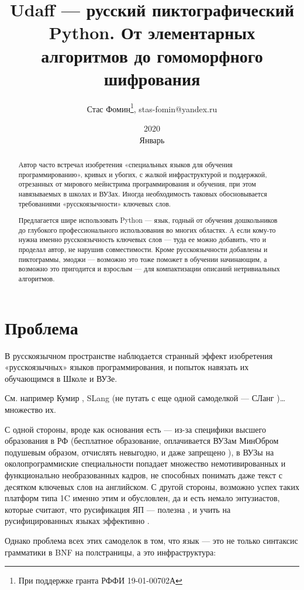 ﻿\documentclass[a4paper,12pt]{article}
\title{Udaff — русский пиктографический Python. От элементарных алгоритмов до гомоморфного шифрования}
\date{2020 \\ Январь}
\author{Стас Фомин\footnote{При поддержке гранта РФФИ 19-01-00702А}, stas-fomin@yandex.ru}
\begin{document}
\maketitle
\begin{abstract}
    Автор часто встречал изобретения «специальных языков для обучения программированию», кривых и убогих, с жалкой инфраструктурой и поддержкой, отрезанных от мирового мейнстрима программирования и обучения, при этом навязываемых в школах и ВУЗах. Иногда необходимость таковых обосновывается требованиями «русскоязычности» ключевых слов. 

    Предлагается шире использовать Python — язык, годный от обучения дошкольников до глубокого профессионального использования во многих областях. А если кому-то нужна именно русскоязычность ключевых слов — туда ее можно добавить, что и проделал автор, не нарушив совместимости. Кроме русскоязычности добавлены и пиктограммы, эмоджи — возможно это тоже поможет в обучении начинающим, а возможно это пригодится и взрослым — для компактизации описаний нетривиальных алгоритмов.
\end{abstract}

\section{Проблема}

В русскоязычном пространстве наблюдается странный эффект изобретения
«русскоязычных» языков программирования, и попыток навязать их
обучающимся в Школе и ВУЗе.  

См. например Кумир \cite{kumir}, SLang \cite{slang}
(не путать с еще одной самоделкой --- СЛанг \cite{slang2})\ldots{} множество их.
  
С одной стороны, вроде как основания есть --- из-за специфики высшего
образования в РФ (бесплатное образование, оплачивается ВУЗам МинОбром
подушевым образом, отчислять невыгодно, и даже запрещено \cite{fire-restricted}), 
в ВУЗы на околопрограммиские специальности попадает множество немотивированных и
функционально необразованных кадров, не способных понимать даже текст с
десятком ключевых слов на английском. С другой стороны, возможно успех
таких платформ типа 1C именно этим и обусловлен, да и есть немало
энтузиастов, которые
считают, что русификация ЯП --- полезна \cite{russification-good}, и
учить на русифицированных
языках эффективно \cite{russification-effective}.

Однако проблема всех этих самоделок в том, что язык --- это не только
синтаксис грамматики в BNF на полстраницы, а это инфраструктура:
\end{document}
